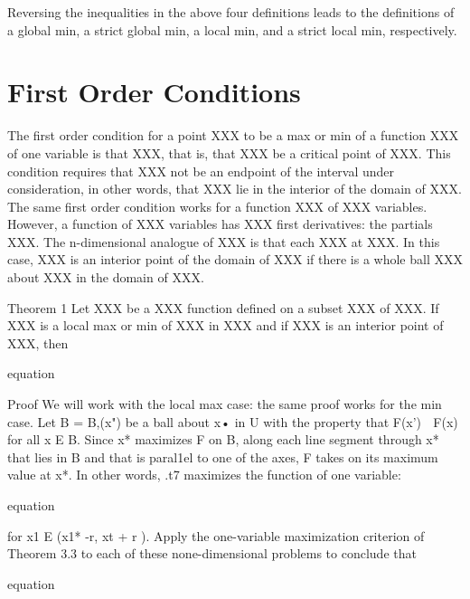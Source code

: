 Reversing the inequalities in the above four definitions leads to the 
definitions of a global min, a strict global min, a local min, and a strict 
local min, respectively. 

\section{First Order Conditions}

The first order condition for a point XXX to be a max or min of a function XXX
of one variable is that XXX, that is, that XXX be a critical point of XXX. This 
condition requires that XXX not be an endpoint of the interval under 
consideration, in other words, that XXX lie in the interior of the domain of XXX.
The same first order condition works for a function XXX of XXX variables. 
However, a function of XXX variables has XXX first derivatives: the partials 
XXX. The n-dimensional analogue of XXX is that each XXX at XXX. In this case, 
XXX is an interior point of the domain of XXX if there is a whole ball 
XXX about XXX in the domain of XXX. 

Theorem 1 Let XXX be a XXX function defined on a subset XXX of XXX. If XXX is a 
local max or min of XXX in XXX and if XXX is an interior point of XXX, then

equation

Proof We will work with the local max case: the same proof works for the min 
case. Let B = B,(x") be a ball about x• in U with the property that
F(x') 􀄦 F(x) for all x E B. Since x* maximizes F on B, along each line 
segment through x* that lies in B and that is paral1el to one of the axes, 
F takes on its maximum value at x*. In other words, .t7 maximizes the function 
of one variable:

equation

for x1 E (x1* -r, xt + r ). Apply the one-variable maximization criterion of
Theorem 3.3 to each of these none-dimensional problems to conclude that

equation

